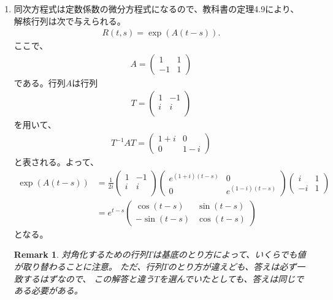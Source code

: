 \documentclass{jsarticle}
\newtheorem{remark}{Remark}
\begin{document}
\begin{enumerate}
\item 同次方程式は定数係数の微分方程式になるので、教科書の定理4.9により、
解核行列は次で与えられる。
\begin{eqnarray}
R(t,s)=\exp(A(t-s)).
\end{eqnarray}
ここで、
\begin{eqnarray}
A=\left(
\begin{array}{cc}
1 & 1\\
-1 & 1
\end{array}
\right)
\end{eqnarray}
である。行列$A$は行列
\begin{eqnarray}
T=\left(
\begin{array}{cc}
1 & -1\\
i & i\\
\end{array}
\right)
\end{eqnarray}
を用いて、
\begin{eqnarray}
T^{-1}AT=\left(
\begin{array}{cc}
1+i & 0\\
0 & 1-i
\end{array}
\right)
\end{eqnarray}
と表される。よって、
\begin{eqnarray}
\exp(A(t-s))&=
\frac{1}{2i}\left(
\begin{array}{cc}
1 & -1\\
i & i\\
\end{array}
\right)\left(
\begin{array}{cc}
e^{(1+i)(t-s)} & 0\\
0 & e^{(1-i)(t-s)}
\end{array}
\right)\left(
\begin{array}{cc}
i & 1\\
-i & 1
\end{array}
\right)\\
&=e^{t-s}\left(
\begin{array}{cc}
\cos(t-s) & \sin(t-s)\\
-\sin(t-s) & \cos(t-s)
\end{array}
\right)
\end{eqnarray}
となる。
\begin{remark}
対角化するための行列$T$は基底のとり方によって、いくらでも値が取り替わることに注意。
ただ、行列$T$のとり方が違えども、答えは必ず一致するはずなので、
この解答と違う$T$を選んでいたとしても、答えは同じである必要がある。
\end{remark}


\end{enumerate}
\end{document}
